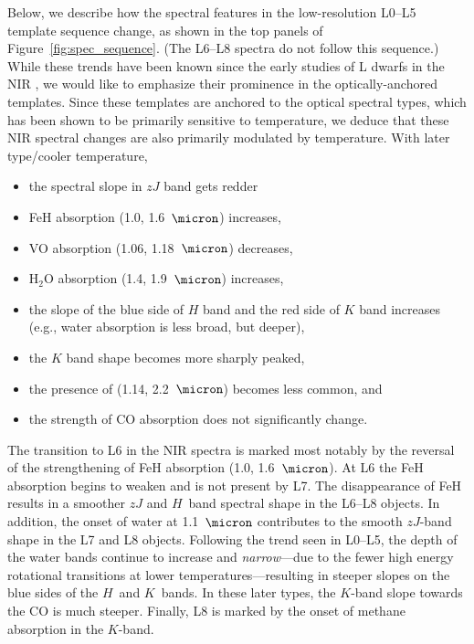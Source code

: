 \documentclass[12pt,preprint]{aastex}
\begin{document}
Below, we describe how the spectral features in the low-resolution L0--L5 template sequence change, as shown in the top panels of Figure~\ref{fig:spec_sequence}. (The L6--L8 spectra do not follow this sequence.)
While these trends have been known since the early studies of L dwarfs in the NIR \citep{Testi01,Reid01_NIR,Geballe02}, we would like to emphasize their prominence in the optically-anchored templates.
Since these templates are anchored to the optical spectral types, which has been shown to be primarily sensitive to temperature, we deduce that these NIR spectral changes are also primarily modulated by temperature.
With later type/cooler temperature, 
\begin{itemize}
\item the spectral slope in $zJ$ band gets redder 
\item FeH absorption (1.0, 1.6~$\micron$) increases,
\item VO absorption (1.06, 1.18~$\micron$) decreases,
\item H$_2$O absorption (1.4, 1.9~$\micron$) increases,
\item the slope of the blue side of $H$ band and the red side of $K$ band increases (e.g., water absorption is less broad, but deeper), 
\item the $K$ band shape becomes more sharply peaked,
\item the presence of  (1.14, 2.2~$\micron$) becomes less common, and
\item the strength of CO absorption does not significantly change.
\end{itemize}

The transition to L6 in the NIR spectra is marked most notably by the reversal of the strengthening of FeH absorption (1.0, 1.6~$\micron$). 
At L6 the FeH absorption begins to weaken and is not present by L7. 
The disappearance of FeH results in a smoother $zJ$ and $H$~band spectral shape in the L6--L8 objects. 
In addition, the onset of water at 1.1~$\micron$ contributes to the smooth $zJ$-band shape in the L7 and L8 objects. 
Following the trend seen in L0--L5, the depth of the water bands continue to increase and \emph{narrow}---due to the fewer high energy rotational transitions at lower temperatures---resulting in steeper slopes on the blue sides of the $H$~and $K$~bands. 
In these later types, the $K$-band slope towards the CO is much steeper. 
Finally, L8 is marked by the onset of methane absorption in the $K$-band. 
\end{document}
